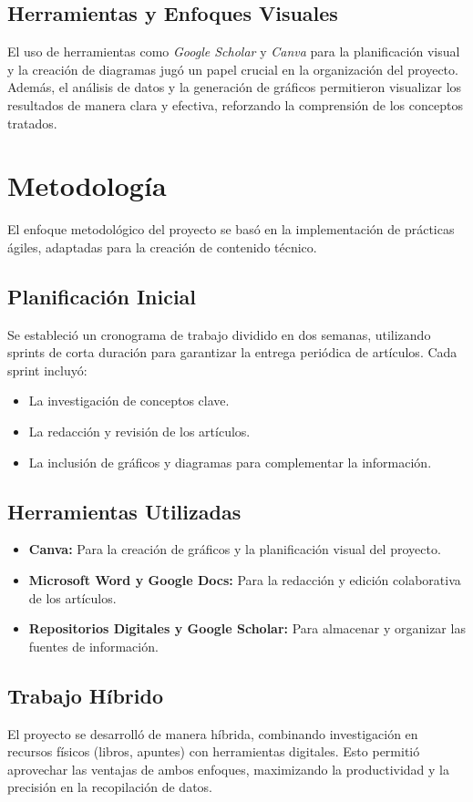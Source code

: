 \documentclass[12pt, a4paper, twocolumn]{article}
\begin{document}
\subsection{Herramientas y Enfoques Visuales}
El uso de herramientas como \textit{Google Scholar} y \textit{Canva} para la planificación visual y la creación de diagramas jugó un papel crucial en la organización del proyecto. Además, el análisis de datos y la generación de gráficos permitieron visualizar los resultados de manera clara y efectiva, reforzando la comprensión de los conceptos tratados.


\section{Metodología}
El enfoque metodológico del proyecto se basó en la implementación de prácticas ágiles, adaptadas para la creación de contenido técnico.

\subsection{Planificación Inicial}
Se estableció un cronograma de trabajo dividido en dos semanas, utilizando sprints de corta duración para garantizar la entrega periódica de artículos. Cada sprint incluyó: 
\begin{itemize}
    \item La investigación de conceptos clave.
    \item La redacción y revisión de los artículos.
    \item La inclusión de gráficos y diagramas para complementar la información.
\end{itemize}

\subsection{Herramientas Utilizadas}
\begin{itemize}
    \item \textbf{Canva:} Para la creación de gráficos y la planificación visual del proyecto.
    \item \textbf{Microsoft Word y Google Docs:} Para la redacción y edición colaborativa de los artículos.
    \item \textbf{Repositorios Digitales y Google Scholar:} Para almacenar y organizar las fuentes de información.
\end{itemize}

\subsection{Trabajo Híbrido}
El proyecto se desarrolló de manera híbrida, combinando investigación en recursos físicos (libros, apuntes) con herramientas digitales. Esto permitió aprovechar las ventajas de ambos enfoques, maximizando la productividad y la precisión en la recopilación de datos.
\end{document}
